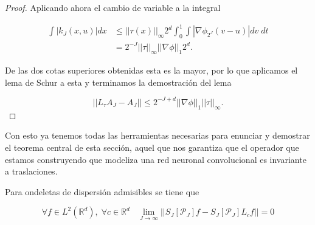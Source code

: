 \begin{proof}
  \noindent Aplicando ahora el cambio de variable a la integral

  \begin{align*}
    \int |k_J(x,u)| dx &\leq ||\tau(x)||_\infty 2^d \int_0^1 \int \left| \nabla \phi_{2^J} (v-u)\right| dv \; dt \\
    &= 2^{-J} ||\tau||_\infty ||\nabla \phi ||_1 2^{d}.
  \end{align*}

  \noindent De las dos cotas superiores obtenidas esta es la mayor, por lo que aplicamos el lema de Schur a esta y terminamos la demostración del lema

  $$ ||L_{\tau} A_J - A_J || \leq 2^{-J+d} ||\nabla \phi ||_1 ||\tau||_\infty. $$
\end{proof}


\noindent Con esto ya tenemos todas las herramientas necesarias para enunciar y demostrar el teorema central de esta sección, aquel que nos garantiza que el operador que estamos construyendo que modeliza una red neuronal convolucional es invariante a traslaciones.

\begin{teorema} \label{invarianzaTraslaciones}
Para ondeletas de dispersión admisibles se tiene que 

$$\forall f \in L^2(\mathbb{R}^d), \; \forall c\in \mathbb{R}^d \;\;\; \lim_{J\rightarrow \infty}||S_J[\mathcal{P}_J] f-S_J[\mathcal{P}_J] L_cf||=0$$
\end{teorema}

